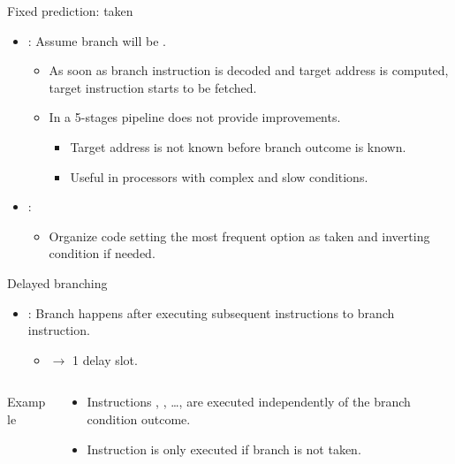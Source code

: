 \begin{frame}[t]{Fixed prediction: taken}
\begin{itemize}
  \item {}: Assume branch will be .
    \begin{itemize}
      \item As soon as branch instruction is decoded and target address
            is computed, target instruction starts to be fetched.
      \item In a 5-stages pipeline does not provide improvements.
        \begin{itemize}
          \item Target address is not known before branch outcome is known.
          \item Useful in processors with complex and slow conditions.
        \end{itemize}
    \end{itemize}

  \item {}:
    \begin{itemize}
      \item Organize code setting the most frequent option as taken
            and inverting condition if needed.
    \end{itemize}
\end{itemize}
\end{frame}

\begin{frame}[t,fragile]{Delayed branching}
\begin{itemize}
  \item {}: Branch happens after executing
         subsequent instructions to branch instruction.
    \begin{itemize}
      \item {} $\rightarrow$ 1 delay slot.
    \end{itemize}
\end{itemize}

\begin{columns}
\begin{column}{.4\textwidth}
\begin{block}{Example}

\end{block}
\end{column}

\begin{column}{.6\textwidth}
\begin{itemize}
  \item Instructions , , \ldots,  are
        executed independently of the branch condition outcome.
  \item Instruction  is only executed if branch is not taken.
\end{itemize}
\end{column}
\end{columns}
\end{frame}


